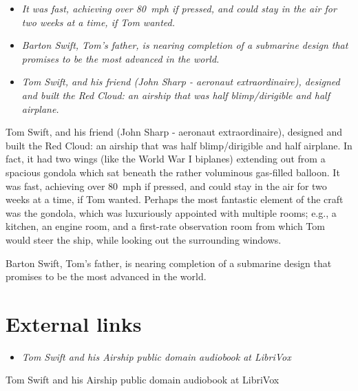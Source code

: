 \begin{itemize}
\item
  \emph{It was fast, achieving over 80~mph if pressed, and could stay in
  the air for two weeks at a time, if Tom wanted.}
\item
  \emph{Barton Swift, Tom's father, is nearing completion of a submarine
  design that promises to be the most advanced in the world.}
\item
  \emph{Tom Swift, and his friend (John Sharp - aeronaut
  extraordinaire), designed and built the Red Cloud: an airship that was
  half blimp/dirigible and half airplane.}
\end{itemize}

Tom Swift, and his friend (John Sharp - aeronaut extraordinaire),
designed and built the Red Cloud: an airship that was half
blimp/dirigible and half airplane. In fact, it had two wings (like the
World War I biplanes) extending out from a spacious gondola which sat
beneath the rather voluminous gas-filled balloon. It was fast, achieving
over 80~mph if pressed, and could stay in the air for two weeks at a
time, if Tom wanted. Perhaps the most fantastic element of the craft was
the gondola, which was luxuriously appointed with multiple rooms; e.g.,
a kitchen, an engine room, and a first-rate observation room from which
Tom would steer the ship, while looking out the surrounding windows.

Barton Swift, Tom's father, is nearing completion of a submarine design
that promises to be the most advanced in the world.

\section{External links}\label{external-links}

\begin{itemize}
\item
  \emph{Tom Swift and his Airship public domain audiobook at LibriVox}
\end{itemize}

Tom Swift and his Airship public domain audiobook at LibriVox
